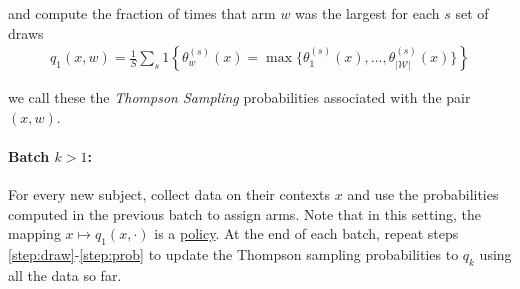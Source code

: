 \documentclass[letterpaper, 12pt, parskip=full, headsepline]{scrartcl}
\begin{document}
\begin{enumerate}
  and compute the fraction of times that arm $w$ was the largest for each $s$ set of draws
  \begin{align}
    q_{1}(x, w) = \frac{1}{S} \sum_{s} 1\left\{ \theta_{w}^{(s)}(x) = \max \{\theta_{1}^{(s)}(x), \dots, \theta_{|\mathcal{W}|}^{(s)}(x) \}  \right\}
  \end{align}

  we call these the \textit{Thompson Sampling} probabilities associated with the pair $(x, w)$. 
\end{enumerate}

\paragraph{Batch $k > 1$:} For every new subject, collect data on their contexts $x$ and use the probabilities computed in the previous batch to assign arms. Note that in this setting, the mapping $x \mapsto q_{1}(x, \cdot)$ is a \hyperlink{policy}{policy}. At the end of each batch, repeat steps \ref{step:draw}-\ref{step:prob} to update the Thompson sampling probabilities to $q_{k}$ using all the data so far.

\clearpage



\clearpage
\appendix
\end{document}
